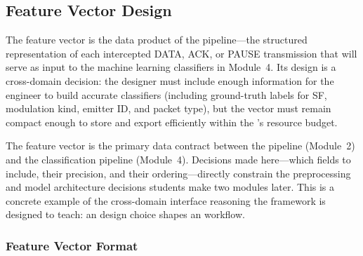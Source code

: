 \documentclass[11pt,letterpaper]{article}
\begin{document}
	\subsection{Feature Vector Design}

	The feature vector is the data product of the \FPGA{} pipeline---the structured representation of each intercepted DATA, ACK, or PAUSE transmission that will serve as input to the machine learning classifiers in Module~4. Its design is a cross-domain decision: the \FPGA{} designer must include enough information for the \ML{} engineer to build accurate classifiers (including ground-truth labels for SF, modulation kind, emitter ID, and packet type), but the vector must remain compact enough to store and export efficiently within the \FPGA{}'s resource budget.

	\begin{tcolorbox}[infobox={Design Principle: Features as Cross-Domain Interface}]
		The feature vector is the primary data contract between the \FPGA{} pipeline (Module~2) and the \ML{} classification pipeline (Module~4). Decisions made here---which fields to include, their precision, and their ordering---directly constrain the preprocessing and model architecture decisions students make two modules later. This is a concrete example of the cross-domain interface reasoning the framework is designed to teach: an \FPGA{} design choice shapes an \ML{} workflow.
	\end{tcolorbox}

	\subsubsection{Feature Vector Format}
\end{document}
